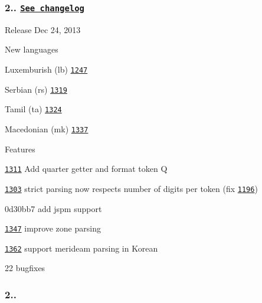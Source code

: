 \subsubsection*{2.. \href{https://gist.github.com/ichernev/8104451}{\tt See changelog}}


\begin{DoxyItemize}
\item Release Dec 24, 2013
\item New languages
\begin{DoxyItemize}
\item Luxemburish (lb) \href{https://github.com/moment/moment/issues/1247}{\tt 1247}
\item Serbian (rs) \href{https://github.com/moment/moment/issues/1319}{\tt 1319}
\item Tamil (ta) \href{https://github.com/moment/moment/issues/1324}{\tt 1324}
\item Macedonian (mk) \href{https://github.com/moment/moment/issues/1337}{\tt 1337}
\end{DoxyItemize}
\item Features
\begin{DoxyItemize}
\item \href{https://github.com/moment/moment/issues/1311}{\tt 1311} Add quarter getter and format token {\ttfamily Q}
\item \href{https://github.com/moment/moment/issues/1303}{\tt 1303} strict parsing now respects number of digits per token (fix \href{https://github.com/moment/moment/issues/1196}{\tt 1196})
\item 0d30bb7 add jspm support
\item \href{https://github.com/moment/moment/issues/1347}{\tt 1347} improve zone parsing
\item \href{https://github.com/moment/moment/issues/1362}{\tt 1362} support merideam parsing in Korean
\end{DoxyItemize}
\item 22 bugfixes
\end{DoxyItemize}

\subsubsection*{2..}


